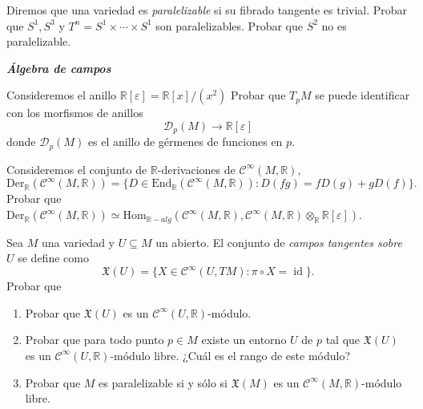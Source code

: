 \documentclass[12pt, a4paper]{amsart}
\theoremstyle{definition}
\newcommand{\RR}{\mathbb{R}}      %
\newcommand{\eps}{\varepsilon}
\DeclareMathOperator{\id}{id}
\begin{document}
\begin{question}
Diremos que una variedad es \textit{paralelizable} si su fibrado tangente es trivial. Probar que $S^1, S^3$ y $T^n=S^1\times\cdots\times S^1$ son paralelizables. Probar que $S^2$ no es paralelizable.
\end{question}


\textsl{\textbf{Álgebra de campos}}

\begin{question}
Consideremos el anillo $\RR[\eps]=\RR[x]/(x^2)$ Probar que $T_p M$ se puede identificar con los morfismos de anillos $$\mathscr{D}_p(M)\to\RR[\eps]$$ donde $\mathscr{D}_p(M)$ es el anillo de gérmenes de funciones en $p$.
\end{question}

\begin{question}
Consideremos el conjunto de $\RR$-derivaciones de $\mathscr{C}^\infty(M,\RR)$, $$\mathrm{Der}_\RR(\mathscr{C}^\infty(M,\RR)) = \{D\in\mathrm{End}_\RR(\mathscr{C}^\infty(M,\RR)) : D(fg) = fD(g)+gD(f)\}.$$ Probar que $\mathrm{Der}_\RR(\mathscr{C}^\infty(M,\RR)) \simeq \mathrm{Hom}_{\RR-alg}(\mathscr{C}^\infty(M,\RR),\mathscr{C}^\infty(M,\RR)\otimes_\RR \RR[\eps])$.
\end{question}

\begin{question}
Sea $M$ una variedad y $U\subseteq M$ un abierto. El conjunto de \textit{campos tangentes sobre $U$} se define como $$\mathfrak{X}(U) = \{X\in\mathscr{C}^\infty(U,TM): \pi\circ X = \id\}.$$ Probar que
\begin{enumerate}[label=\textbf{\alph*.}]
\item Probar que $\mathfrak{X}(U)$ es un $\mathscr{C}^\infty(U,\RR)$-módulo.
\item Probar que para todo punto $p\in M$ existe un entorno $U$ de $p$ tal que $\mathfrak{X}(U)$ es un $\mathscr{C}^\infty(U,\RR)$-módulo libre. ¿Cuál es el rango de este módulo?
\item Probar que $M$ es paralelizable si y sólo si $\mathfrak{X}(M)$ es un $\mathscr{C}^\infty(M,\RR)$-módulo libre.
\end{enumerate}
\end{question}
\end{document}
